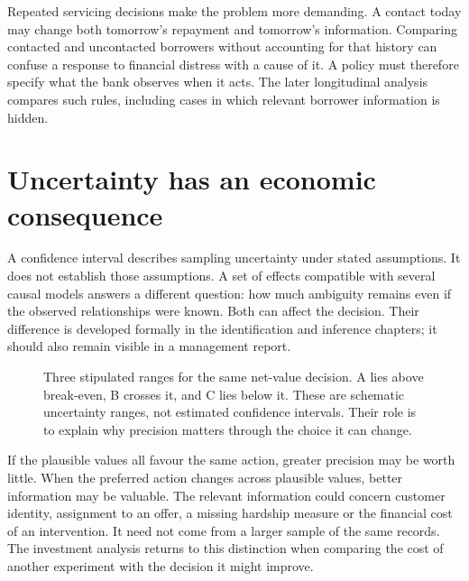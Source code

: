 Repeated servicing decisions make the problem more demanding. A contact today
may change both tomorrow's repayment and tomorrow's information. Comparing
contacted and uncontacted borrowers without accounting for that history can
confuse a response to financial distress with a cause of it. A policy must
therefore specify what the bank observes when it acts. The later longitudinal
analysis compares such rules, including cases in which relevant borrower
information is hidden.

\section{Uncertainty has an economic consequence}

A confidence interval describes sampling uncertainty under stated assumptions.
It does not establish those assumptions. A set of effects compatible with
several causal models answers a different question: how much ambiguity remains
even if the observed relationships were known. Both can affect the decision.
Their difference is developed formally in the identification and inference
chapters; it should also remain visible in a management report.

\begin{figure}[htbp]\centering
{}
\caption{Three stipulated ranges for the same net-value decision. A lies above
break-even, B crosses it, and C lies below it. These are schematic uncertainty
ranges, not estimated confidence intervals. Their role is to explain why
precision matters through the choice it can change.}
\label{reading:uncertainty}
\end{figure}

If the plausible values all favour the same action, greater precision may be
worth little. When the preferred action changes across plausible values, better
information may be valuable. The relevant information could concern customer
identity, assignment to an offer, a missing hardship measure or the financial
cost of an intervention. It need not come from a larger sample of the same
records. The investment analysis returns to this distinction when comparing
the cost of another experiment with the decision it might improve.

